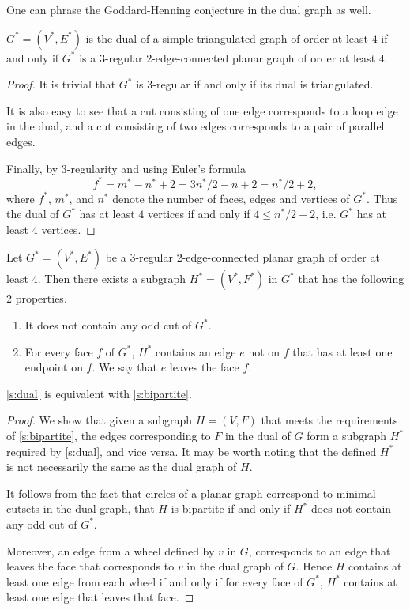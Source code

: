 One can phrase the Goddard-Henning conjecture in the dual graph as well.

\begin{claim}
  $G^* = (V^*, E^*)$ is the dual of a simple triangulated graph of order at least $4$
  if and only if $G^*$ is a $3$-regular $2$-edge-connected planar graph of order at least $4$.
\end{claim}
\begin{proof}
  It is trivial that $G^*$ is $3$-regular if and only if its dual is triangulated.

  It is also easy to see that a cut consisting of one edge corresponds to a loop
  edge in the dual, and a cut consisting of two edges corresponds to a pair of parallel edges.

  Finally, by $3$-regularity and using Euler's formula $$f^* = m^* - n^* + 2 =
  3n^*/2 - n + 2 = n^*/2 + 2,$$ where $f^*$, $m^*$, and $n^*$ denote the number of faces, edges
  and vertices of $G^*$. Thus the dual of $G^*$ has at least $4$ vertices if
  and only if $4 \le n^*/2 + 2$, i.e. $G^*$ has at least $4$ vertices.
\end{proof}

\begin{guess} \label{s:dual}
  Let $G^* = (V^*, E^*)$ be a $3$-regular $2$-edge-connected planar graph of order at least $4$.
  Then there exists a subgraph $H^* = (V^*, F^*)$ in $G^*$ that has the following $2$ properties.
  \begin{enumerate}
    \item It does not contain any odd cut of $G^*$.
    \item For every face $f$ of $G^*$, $H^*$ contains an edge $e$ not on $f$ that has at least one
    endpoint on $f$. We say that $e$ leaves the face $f$.
  \end{enumerate}
\end{guess}

\begin{claim}
  \ref{s:dual} is equivalent with \ref{s:bipartite}.
\end{claim}
\begin{proof}
  We show that given a subgraph $H = (V, F)$ that meets the requirements of \ref{s:bipartite},
  the edges corresponding to $F$ in the dual of $G$ form a subgraph $H^*$ required by
  \ref{s:dual}, and vice versa. It may be worth noting that the defined $H^*$ is
  not necessarily the same as the dual graph of $H$.

  It follows from the fact that circles of a planar graph correspond to minimal cutsets in the
  dual graph, that $H$ is bipartite if and only if $H^*$ does not contain any odd cut of $G^*$.

  Moreover, an edge from a wheel defined by $v$ in $G$, corresponds to an edge
  that leaves the face that corresponds to $v$ in the dual graph of $G$.
  Hence $H$ contains at least one edge from each wheel if and only if for every face
  of $G^*$, $H^*$ contains at least one edge that leaves that face.
\end{proof}


